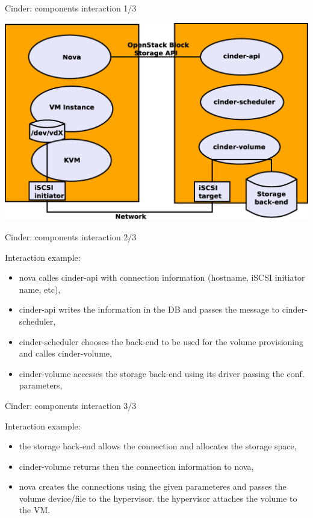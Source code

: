 \documentclass[english,serif,mathserif]{beamer}
\begin{document}
\begin{frame}{Cinder: components interaction 1/3}

\centerline{\includegraphics[scale=0.30]{cinder.eps}}

\end{frame}

\begin{frame}{Cinder: components interaction 2/3}

Interaction example:

\begin{itemize}
\item nova calles cinder-api with connection information (hostname, iSCSI initiator name, etc),
\item cinder-api writes the information in the DB and passes the message to cinder-scheduler,
\item cinder-scheduler chooses the back-end to be used for the volume provisioning and calles cinder-volume,
\item cinder-volume accesses the storage back-end using its driver passing the conf. parameters,
\end{itemize}

\end{frame}

\begin{frame}{Cinder: components interaction 3/3}

Interaction example:

\begin{itemize}
\item the storage back-end allows the connection and allocates the storage space,
\item cinder-volume returns then the connection information to nova,
\item nova creates the connections using the given parameteres and passes the volume device/file to the hypervisor.
\itme the hypervisor attaches the volume to the VM.
\end{itemize}

\end{frame}
\end{document}
